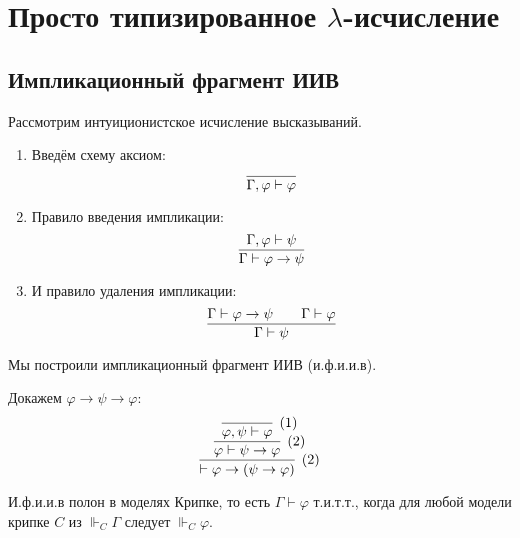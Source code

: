 \section{\texorpdfstring{Просто типизированное $\lambda$-исчисление}{Simply typed lambda calculus}}

\subsection{\texorpdfstring{Импликационный фрагмент ИИВ}{Implication fragment of intuitionistic logic}}

\begin{definition}
    Рассмотрим интуиционистское исчисление высказываний.
    \begin{enumerate}
        \item Введём схему аксиом:
        \[
            \infer{\Gamma, \varphi \vdash \varphi}{}
        \]
        \item Правило введения импликации:
        \[
            \infer{\Gamma \vdash \varphi \rightarrow \psi}{\Gamma, \varphi \vdash \psi}
        \]
        \item И правило удаления импликации:
        \[
            \infer{\Gamma \vdash \psi}{\Gamma \vdash \varphi \rightarrow \psi && \Gamma \vdash \varphi}
        \]
    \end{enumerate}

    Мы построили импликационный фрагмент ИИВ (и.ф.и.и.в).
\end{definition}

\begin{example} Докажем $\varphi \rightarrow \psi \rightarrow \varphi$:
\[
    \infer[(2)]
        { \vdash \varphi \rightarrow (\psi \rightarrow \varphi) }
        { \infer[(2)]
            { \varphi \vdash \psi \rightarrow \varphi }
            { \infer[(1)]
                { \varphi, \psi \vdash \varphi}
                {}
            }
        }
\]
\end{example}

\begin{theorem}
    И.ф.и.и.в полон в моделях Крипке, то есть $\Gamma \vdash \varphi$ т.и.т.т.,
    когда для любой модели крипке $C$ из $\Vdash_C \Gamma$ следует $\Vdash_C \varphi$.
\end{theorem}

